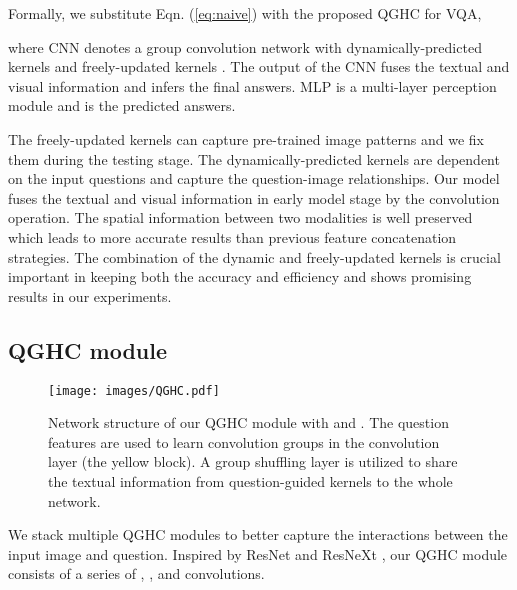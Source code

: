\documentclass[runningheads]{llncs}
\begin{document}
Formally, we substitute Eqn. (\ref{eq:naive}) with the proposed QGHC for VQA,

where CNN denotes a group convolution network with dynamically-predicted kernels  and freely-updated kernels . The output of the CNN  fuses the textual and visual information and infers the final answers. MLP is a multi-layer perception module and  is the predicted answers.

The freely-updated kernels can capture pre-trained image patterns and we fix them during the testing stage. The dynamically-predicted kernels are dependent on the input questions and capture the question-image relationships. Our model fuses the textual and visual information in early model stage by the convolution operation. The spatial information between two modalities is well preserved which leads to more accurate results than previous feature concatenation strategies. The combination of the dynamic and freely-updated kernels is crucial important in keeping both the accuracy and efficiency and shows promising results in our experiments.


\subsection{QGHC module}
\label{sec:lghc_module}

\begin{figure}[t]
  \begin{center}
    \texttt{[image: images/QGHC.pdf]}
  \end{center}
  \caption{Network structure of our QGHC module with  and . The question features are used to learn  convolution groups in the  convolution layer (the yellow block). A group shuffling layer is utilized to share the textual information from question-guided kernels to the whole network.}
  \label{fig:QGHC}
\end{figure}

We stack multiple QGHC modules to better capture the interactions between the input image and question. Inspired by ResNet \cite{he2016deep} and ResNeXt \cite{xie2016aggregated}, our QGHC module consists of a series of , , and  convolutions. 
\end{document}
